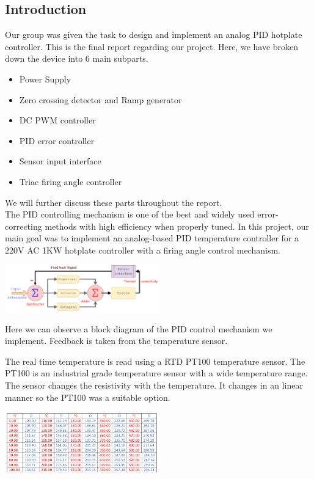\begin{multicols}{2}
\chapter{Introduction}

Our group was given the task to design and implement an analog PID hotplate controller. This is the final report regarding our project. Here, we have broken down the device into 6 main subparts. 
\begin{itemize}
    \item Power Supply
    \item Zero crossing detector and Ramp generator
    \item DC PWM controller
    \item PID error controller
    \item Sensor input interface
    \item Triac firing angle controller
\end{itemize}
We will further discuss these parts throughout the report.\\
The PID controlling mechanism is one of the best and widely used error-correcting methods with high efficiency when properly tuned. In this project, our main goal was to implement an analog-based PID temperature controller for a 220V AC 1KW hotplate controller with a firing angle control mechanism.
\begin{center}
    
    \includegraphics[width=0.5\textwidth]{Introduction/PiD .pdf}
    
\end{center}
Here we can observe a block diagram of the PID control mechanism we implement. Feedback is taken from the temperature sensor.

The real time temperature is read using a RTD PT100 temperature sensor. The PT100 is an industrial grade temperature sensor with a wide temperature range. The sensor changes the resistivity with the temperature. It changes in an linear manner so the PT100 was a suitable option.
\begin{center}
    \includegraphics[width=0.5\textwidth]{Introduction/pt100 range updated-cropped.pdf}
    

\end{center}
\end{multicols}
